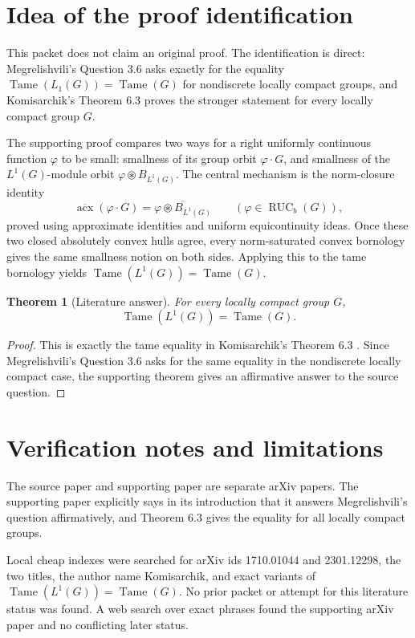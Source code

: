 \documentclass[11pt]{article}
\newtheorem{theorem}{Theorem}
\newcommand{\Tame}{\operatorname{Tame}}
\newcommand{\RUC}{\operatorname{RUC}_{b}}
\newcommand{\acx}{\operatorname{acx}}
\begin{document}
\section*{Idea of the proof identification}

This packet does not claim an original proof.  The identification is direct:
Megrelishvili's Question 3.6 asks exactly for the equality
\(\Tame(L_1(G))=\Tame(G)\) for nondiscrete locally compact groups, and
Komisarchik's Theorem 6.3 proves the stronger statement for every locally
compact group \(G\).

The supporting proof compares two ways for a right uniformly continuous
function \(\varphi\) to be small: smallness of its group orbit
\(\varphi\cdot G\), and smallness of the \(L^1(G)\)-module orbit
\(\varphi\circledast B_{L^1(G)}\).  The central mechanism is the norm-closure
identity
\[
  \overline{\acx}(\varphi\cdot G)
  =
  \overline{\varphi\circledast B_{L^1(G)}}
  \qquad(\varphi\in\RUC(G)),
\]
proved using approximate identities and uniform equicontinuity ideas.  Once
these two closed absolutely convex hulls agree, every norm-saturated convex
bornology gives the same smallness notion on both sides.  Applying this to the
tame bornology yields \(\Tame(L^1(G))=\Tame(G)\).

\begin{theorem}[Literature answer]
For every locally compact group \(G\),
\[
  \Tame(L^1(G))=\Tame(G).
\]
\end{theorem}

\begin{proof}
This is exactly the tame equality in Komisarchik's Theorem 6.3
\cite[Theorem 6.3]{KomisarchikL1Tame}.  Since Megrelishvili's Question 3.6
asks for the same equality in the nondiscrete locally compact case, the
supporting theorem gives an affirmative answer to the source question.
\end{proof}

\section*{Verification notes and limitations}

The source paper and supporting paper are separate arXiv papers.  The
supporting paper explicitly says in its introduction that it answers
Megrelishvili's question affirmatively, and Theorem 6.3 gives the equality for
all locally compact groups.

Local cheap indexes were searched for arXiv ids 1710.01044 and 2301.12298,
the two titles, the author name Komisarchik, and exact variants of
\(\Tame(L^1(G))=\Tame(G)\).  No prior packet or attempt for this literature
status was found.  A web search over exact phrases found the supporting arXiv
paper and no conflicting later status.
\end{document}

